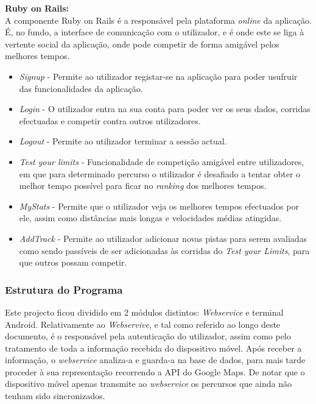 \documentclass[15pt,a4paper]{article}
\begin{document}
\textbf{Ruby on Rails:}
\\

A componente Ruby on Rails é a responsável pela plataforma  \textit{online} da aplicação. É, no fundo, a interface de comunicação com o utilizador, e é onde este se liga à vertente social da aplicação, onde pode competir de forma amigável pelos melhores tempos. 

\begin{itemize}

 \item \textit{Signup} - Permite ao utilizador registar-se na aplicação para poder usufruir das funcionalidades da aplicação.

 \item \textit{Login} - O utilizador entra na sua conta para poder ver os seus dados, corridas efectuadas e competir contra outros utilizadores.

 \item \textit{Logout} - Permite ao utilizador terminar a sessão actual.

 \item \textit{Test your limits} - Funcionalidade de competição amigável entre utilizadores, em que para determinado percurso o utilizador é desafiado a tentar obter o melhor tempo possível para ficar no  \textit{ranking} dos melhores tempos.

 \item \textit{MyStats} -  Permite que o utilizador veja os melhores tempos efectuados por ele, assim como distâncias mais longas e velocidades médias atingidas.

 \item \textit{AddTrack} -  Permite ao utilizador adicionar novas pistas para serem avaliadas como sendo passíveis de ser adicionadas às corridas do \textit{Test your Limits}, para que outros possam competir.

\end{itemize}


\subsubsection{Estrutura do Programa}

Este projecto ficou dividido em 2 módulos distintos: \textit{Webservice} e terminal Android. Relativamente ao \textit{Webservive}, e tal como referido ao longo deste documento, é o responsável pela autenticação do utilizador, assim como pelo tratamento de toda a informação recebida do dispositivo móvel. Após receber a informação, o \textit{webservice} analiza-a e guarda-a na base de dados, para mais tarde proceder à sua representação recorrendo a API do Google Maps. De notar que o dispositivo móvel apenas transmite ao \textit{webservice} os percursos que ainda não tenham sido sincronizados.
\end{document}

